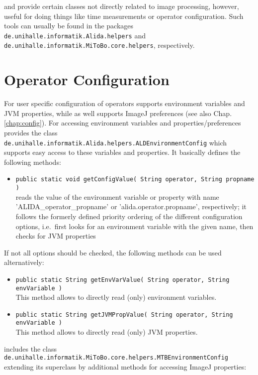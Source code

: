 \alida and \mitobo provide certain classes not directly related to image processing, however, useful for doing things like time
measurements or operator configuration. Such tools can usually be found in the packages {\tt de.unihalle.informatik.Alida.helpers}
and {\tt de.unihalle.informatik.MiToBo.core.helpers}, respectively.

\section{Operator Configuration}
\label{tools:plugconf}
For user specific configuration of operators \alida supports environment variables and JVM properties, while \mitobo as well supports 
ImageJ preferences (see also Chap. \ref{chap:config}). For accessing environment variables and properties/preferences \alida 
provides the class \texttt{de.unihalle.informatik.Alida.helpers.ALDEnvironmentConfig} which supports easy access to these variables
and properties. It basically defines the following methods:
\begin{itemize}
    \item {\small \texttt{public static void getConfigValue( String operator,	String propname )}}\\[0.2cm]
    	reads the value of the environment variable or property with name \mbox{'ALIDA\_operator\_propname'} or 'alida.operator.propname',
    	respectively; it follows the formerly defined 
    	priority ordering of the different configuration options, i.e.~first looks for an environment variable with the given name, 
    	then checks for JVM properties 
\end{itemize} 
If not all options should be checked, the following methods can be used alternatively:
\begin{itemize}
    \item {\small \texttt{public static String getEnvVarValue( String operator, String envVariable )}}\\[0.2cm] 
    	This method allows to directly read (only) environment variables. 
    \item {\small \texttt{public static String getJVMPropValue( String operator, String envVariable )}}\\[0.2cm] 
    	This method allows to directly read (only) JVM properties. 
\end{itemize}
\mitobo includes the class \texttt{de.unihalle.informatik.MiToBo.core.helpers.MTBEnviron\-mentConfig} extending its \alida superclass
by additional methods for accessing ImageJ properties:
